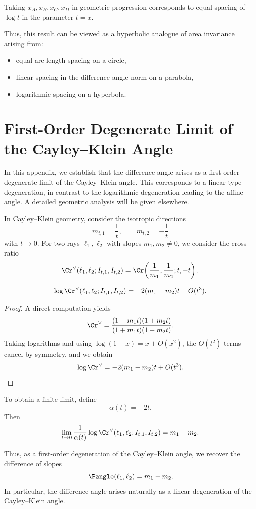 \documentclass[12pt]{article}
\begin{document}
\begin{remark}
Taking $x_A,x_B,x_C,x_D$ in geometric progression
corresponds to equal spacing of $\log t$ in the parameter $t=x$.

Thus, this result can be viewed as a hyperbolic analogue of
area invariance arising from:
\begin{itemize}
\item equal arc-length spacing on a circle,
\item linear spacing in the difference-angle norm on a parabola,
\item logarithmic spacing on a hyperbola.
\end{itemize}
\end{remark}


\section{First-Order Degenerate Limit of the Cayley--Klein Angle}

In this appendix, we establish that the difference angle arises as a first-order
degenerate limit of the Cayley--Klein angle.
This corresponds to a linear-type degeneration, in contrast to the logarithmic
degeneration leading to the affine angle.
A detailed geometric analysis will be given elsewhere.

\vspace{1ex}

In Cayley--Klein geometry, consider the isotropic directions
\[
m_{t,1}=\frac{1}{t}, \qquad
m_{t,2}=-\frac{1}{t}
\]
with $t\to 0$.
For two rays $\ell_1,\ell_2$ with slopes $m_1,m_2\neq0$,
we consider the cross ratio
\[
\Cr^\vee(\ell_1,\ell_2;I_{t,1},I_{t,2})
=
\Cr\!\left(
\frac{1}{m_1},\frac{1}{m_2};
t,-t
\right).
\]

\begin{lemma}
\[
\log\Cr^\vee(\ell_1,\ell_2;I_{t,1},I_{t,2})
=
-2(m_1-m_2)t + O(t^3).
\]
\end{lemma}

\begin{proof}
A direct computation yields
\[
\Cr^\vee
=
\frac{(1-m_1t)(1+m_2t)}
     {(1+m_1t)(1-m_2t)}.
\]
Taking logarithms and using $\log(1+x)=x+O(x^2)$,
the $O(t^2)$ terms cancel by symmetry, and we obtain
\[
\log\Cr^\vee
=
-2(m_1-m_2)t + O(t^3).
\]
\end{proof}

To obtain a finite limit, define
\[
\alpha(t)=-2t.
\]
Then
\[
\lim_{t\to0}
\frac{1}{\alpha(t)}
\log\Cr^\vee(\ell_1,\ell_2;I_{t,1},I_{t,2})
=
m_1-m_2.
\]

Thus, as a first-order degeneration of the Cayley--Klein angle,
we recover the difference of slopes
\[
\Pangle(\ell_1,\ell_2)=m_1-m_2.
\]
In particular, the difference angle arises naturally
as a linear degeneration of the Cayley--Klein angle.





\end{document}
